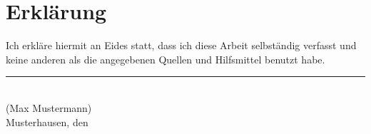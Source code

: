
\cleardoublepage
\thispagestyle{plain}
\vspace*{\fill}

\section*{Erklärung}

Ich erkläre hiermit an Eides statt, dass ich diese Arbeit selbständig verfasst und keine
anderen als die angegebenen Quellen und Hilfsmittel benutzt habe.

\vskip2cm

\rule{5cm}{0.4pt}\\
(Max Mustermann)\\
Musterhausen, den \duedate